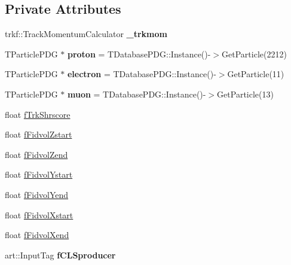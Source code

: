 \subsection*{Private Attributes}
\begin{DoxyCompactItemize}
\item 
\hypertarget{classselection_1_1CC0piNpSelection_a82c14d3fa8ea4b3edff07521b2f7c1b9}{trkf\-::\-Track\-Momentum\-Calculator {\bfseries \-\_\-trkmom}}\label{classselection_1_1CC0piNpSelection_a82c14d3fa8ea4b3edff07521b2f7c1b9}

\item 
\hypertarget{classselection_1_1CC0piNpSelection_a721706e2b68efe51225fa6388bc184d1}{T\-Particle\-P\-D\-G $\ast$ {\bfseries proton} = T\-Database\-P\-D\-G\-::\-Instance()-\/$>$Get\-Particle(2212)}\label{classselection_1_1CC0piNpSelection_a721706e2b68efe51225fa6388bc184d1}

\item 
\hypertarget{classselection_1_1CC0piNpSelection_ad04f8899cec1c9c54e720126e61a872f}{T\-Particle\-P\-D\-G $\ast$ {\bfseries electron} = T\-Database\-P\-D\-G\-::\-Instance()-\/$>$Get\-Particle(11)}\label{classselection_1_1CC0piNpSelection_ad04f8899cec1c9c54e720126e61a872f}

\item 
\hypertarget{classselection_1_1CC0piNpSelection_ae1161170f7b46e368ad608924cc412fd}{T\-Particle\-P\-D\-G $\ast$ {\bfseries muon} = T\-Database\-P\-D\-G\-::\-Instance()-\/$>$Get\-Particle(13)}\label{classselection_1_1CC0piNpSelection_ae1161170f7b46e368ad608924cc412fd}

\item 
float \hyperlink{classselection_1_1CC0piNpSelection_ab72eccf7dab3acafa294a0d8f3e225a0}{f\-Trk\-Shrscore}
\item 
float \hyperlink{classselection_1_1CC0piNpSelection_afe5a2b82ecad103b98362839094c47e0}{f\-Fidvol\-Zstart}
\item 
float \hyperlink{classselection_1_1CC0piNpSelection_a9ac28bcb4ef95573d416dec35202b18e}{f\-Fidvol\-Zend}
\item 
float \hyperlink{classselection_1_1CC0piNpSelection_ac59a66f695af8314018029e4480db16a}{f\-Fidvol\-Ystart}
\item 
float \hyperlink{classselection_1_1CC0piNpSelection_a4732dc1091cb1881c741d57f999b5035}{f\-Fidvol\-Yend}
\item 
float \hyperlink{classselection_1_1CC0piNpSelection_a783e7f9dcd42c083658870f7d23931da}{f\-Fidvol\-Xstart}
\item 
float \hyperlink{classselection_1_1CC0piNpSelection_a754589459e1f2d90a8ad853c68f864db}{f\-Fidvol\-Xend}
\item 
\hypertarget{classselection_1_1CC0piNpSelection_a3d64505ea3757aa3d729aca8e871cd95}{art\-::\-Input\-Tag {\bfseries f\-C\-L\-Sproducer}}\label{classselection_1_1CC0piNpSelection_a3d64505ea3757aa3d729aca8e871cd95}


\end{DoxyCompactItemize}
